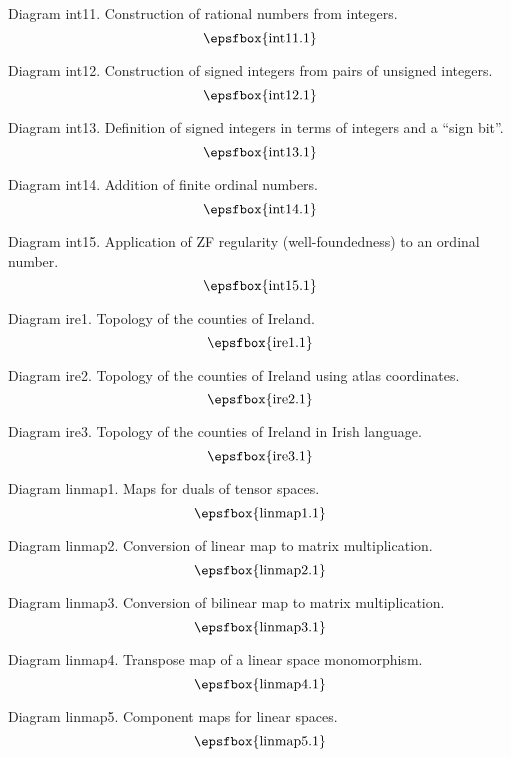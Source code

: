 Diagram int11. Construction of rational numbers from integers.
$$
\centerline{\epsfbox{int11.1}}
$$

Diagram int12. Construction of signed integers from pairs of unsigned integers.
$$
\centerline{\epsfbox{int12.1}}
$$

Diagram int13. Definition of signed integers in terms of integers and a ``sign
bit''.
$$
\centerline{\epsfbox{int13.1}}
$$

Diagram int14. Addition of finite ordinal numbers.
$$
\centerline{\epsfbox{int14.1}}
$$

\filleject

Diagram int15. Application of ZF regularity (well-foundedness) to an ordinal
number.
$$
\centerline{\epsfbox{int15.1}}
$$

\secteject
\edef\SECTire{\the\pageno}

Diagram ire1. Topology of the counties of Ireland.
$$
\centerline{\epsfbox{ire1.1}}
$$

Diagram ire2. Topology of the counties of Ireland using atlas coordinates.
$$
\centerline{\epsfbox{ire2.1}}
$$

\filleject

Diagram ire3. Topology of the counties of Ireland in Irish language.
$$
\centerline{\epsfbox{ire3.1}}
$$

\secteject
\edef\SECTlinmap{\the\pageno}

Diagram linmap1. Maps for duals of tensor spaces.
$$
\centerline{\epsfbox{linmap1.1}}
$$

Diagram linmap2. Conversion of linear map to matrix multiplication.
$$
\centerline{\epsfbox{linmap2.1}}
$$

Diagram linmap3. Conversion of bilinear map to matrix multiplication.
$$
\centerline{\epsfbox{linmap3.1}}
$$

\filleject

Diagram linmap4. Transpose map of a linear space monomorphism.
$$
\centerline{\epsfbox{linmap4.1}}
$$

Diagram linmap5. Component maps for linear spaces.
$$
\centerline{\epsfbox{linmap5.1}}
$$


